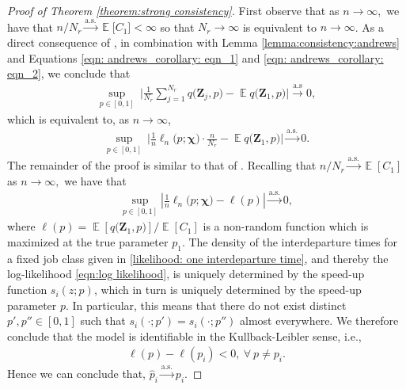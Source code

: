 \documentclass[11pt]{article}
\newcommand{\jp}[1]{\footnote{J-P: #1}}
\theoremstyle{remark}
\theoremstyle{definition}
\DeclareMathOperator{\exptn}{\mathbb{E}}
\newcommand{\bs}[1]{{\boldsymbol #1 }}
\numberwithin{equation}{section}
\begin{document}
\begin{proof} [Proof of Theorem \ref{theorem:strong consistency}] 
First observe that as $n \rightarrow \infty,$ we have that $n/N_r \overset{\text{a.s.}}{\longrightarrow} \exptn\big[C_1\big] < \infty$ so that 
$N_r \rightarrow \infty$ is equivalent to $n \rightarrow \infty$.
As a direct consequence of  \cite[Theorem 3(b)]{andrews1992}, 
in combination with
Lemma \ref{lemma:consistency:andrews} and Equations \eqref{eqn: andrews_corollary: eqn_1} and \eqref{eqn: andrews_corollary: eqn_2}, we conclude that 
\begin{align}
    \sup_{p \in [0,1]} \ \Bigg|\frac{1}{N_r} \sum_{j=1}^{N_r} q\big(\bs{Z}_j, p\big) - \exptn q\big({\bs{Z}_1}, p\big) \Bigg| \overset{\text{a.s}}{\longrightarrow} 0, \label{eqn: U-SLLN}
\end{align}
which is equivalent to, as $n \rightarrow \infty$, 
\begin{align*}
    \sup_{p \in [0,1]} \ \Bigg\vert \frac{1}{n} \ell_n\big(p; \bs\chi\big)\cdot \frac{n}{N_r} - \exptn q\big({\bs{Z}_1}, p\big) \Bigg\vert \overset{\text{a.s.}}{\longrightarrow} 0.
\end{align*}
The remainder of the proof is similar to that of \cite[Theorem 1]{inoue2023}.
Recalling that $n/N_r \overset{\text{a.s.}}{\longrightarrow} \exptn[C_1]$ as $n \rightarrow \infty,$ we have that
\begin{align*}
    \sup_{p \in [0,1]} \left\vert \frac{1}{n}\ell_n\big(p; \bs\chi\big)-\ell(p) \right\vert \overset{\text{a.s.}}{\longrightarrow} 0 ,
\end{align*}
where $\ell(p)=\exptn[q\big({\bs{Z}_1}, p\big)]/\exptn[C_1]$ is a non-random function which is maximized at the true parameter $p_1$.
The density of the interdeparture times for a fixed job class given in \eqref{likelihood: one interdeparture time}, and thereby the log-likelihood \eqref{eqn:log likelihood}, is uniquely determined by the speed-up function $s_i(z;p)$, which in turn is uniquely determined by the speed-up parameter $p$.
In particular, this means that there do not exist distinct $p', p'' \in [0,1]$ such that $s_i(\cdot;p') = s_i(\cdot;p'')$ almost everywhere.
We therefore conclude that the model is identifiable in the Kullback-Leibler sense, i.e.,
\begin{align*}
    \ell(p) - \ell(p_i) < 0, \ \forall \ p \neq p_i.
\end{align*}
Hence we can conclude that, $\widehat{p}_{i} \overset{\text{a.s.}}{\longrightarrow} p_i$. 
\end{proof}
\end{document}
